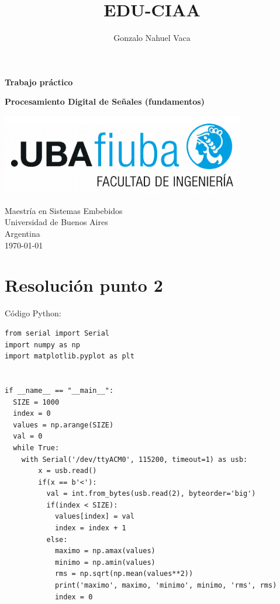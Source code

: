 \documentclass[
    11pt,
    spanish,
	a4paper
]{article}
\title{EDU-CIAA}
\author{Gonzalo Nahuel Vaca}
\def\doctype{Trabajo práctico}
\begin{document}
\makeatletter
\begin{titlepage}
	\begin{center}
		\vspace*{1cm}
		
		\Huge
		\textbf{\doctype}
		\vspace{0.5cm}
    
		\LARGE
		\@title
		\vspace{0.5cm}
    
		\textbf{Procesamiento Digital de Señales (fundamentos)}
		
		\vspace{1.5cm}
		
		\textbf{\@author}

		\vspace{1.5cm}

		\includegraphics[width=0.8\textwidth]{img/logoFIUBA.pdf}
		
		\vfill
		Maestría en Sistemas Embebidos\\
		Universidad de Buenos Aires\\
		Argentina\\
		\today
	\end{center}
\end{titlepage}
\makeatother
\newpage

\section{Resolución punto 2}

Código Python:

\begin{lstlisting}
from serial import Serial
import numpy as np
import matplotlib.pyplot as plt


if __name__ == "__main__":
  SIZE = 1000
  index = 0
  values = np.arange(SIZE)
  val = 0
  while True:
    with Serial('/dev/ttyACM0', 115200, timeout=1) as usb:
        x = usb.read()
        if(x == b'<'):
          val = int.from_bytes(usb.read(2), byteorder='big')
          if(index < SIZE):
            values[index] = val
            index = index + 1
          else:
            maximo = np.amax(values)
            minimo = np.amin(values)
            rms = np.sqrt(np.mean(values**2))
            print('maximo', maximo, 'minimo', minimo, 'rms', rms)
            index = 0
\end{lstlisting}
\end{document}
